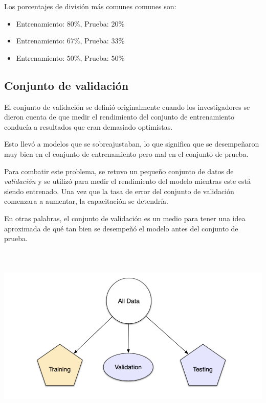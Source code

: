 \documentclass[
]{book}
\providecommand{\tightlist}{%
  \setlength{\itemsep}{0pt}\setlength{\parskip}{0pt}}
\begin{document}
Los porcentajes de división más comunes comunes son:

\begin{itemize}
\tightlist
\item
  Entrenamiento: \(80\%\), Prueba: \(20\%\)
\item
  Entrenamiento: \(67\%\), Prueba: \(33\%\)
\item
  Entrenamiento: \(50\%\), Prueba: \(50\%\)
\end{itemize}

\hypertarget{conjunto-de-validaciuxf3n}{%
\subsection{Conjunto de validación}\label{conjunto-de-validaciuxf3n}}

El conjunto de validación se definió originalmente cuando los investigadores se dieron cuenta de que medir el rendimiento del conjunto de entrenamiento conducía a resultados que eran demasiado optimistas.

Esto llevó a modelos que se sobreajustaban, lo que significa que se desempeñaron muy bien en el conjunto de entrenamiento pero mal en el conjunto de prueba.

Para combatir este problema, se retuvo un pequeño conjunto de datos de \emph{validación} y se utilizó para medir el rendimiento del modelo mientras este está siendo entrenado. Una vez que la tasa de error del conjunto de validación comenzara a aumentar, la capacitación se detendría.

En otras palabras, el conjunto de validación es un medio para tener una idea aproximada de qué tan bien se desempeñó el modelo antes del conjunto de prueba.

\begin{center}\includegraphics[width=500pt,height=250pt]{img/04-ml/3-5-3-conjunto-validacion} \end{center}
\end{document}
